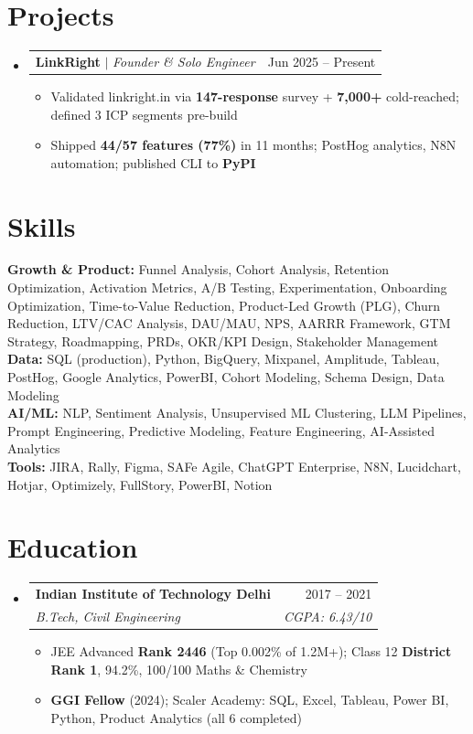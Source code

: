 \documentclass[a4paper,10pt]{article}
\makeatletter
\newcommand{\resumeItem}[1]{
  \item\small{#1\vspace{-2pt}}
}
\newcommand{\resumeSubheading}[4]{
  \vspace{-2pt}\item
  \begin{tabular*}{0.97\textwidth}[t]{l@{\extracolsep{\fill}}r}
    \textbf{#1} & #2 \\
    \textit{\small#3} & \textit{\small #4} \\
  \end{tabular*}\vspace{-7pt}
}
\newcommand{\resumeProjectHeading}[2]{
  \item
  \begin{tabular*}{0.97\textwidth}{l@{\extracolsep{\fill}}r}
    \small#1 & #2 \\
  \end{tabular*}\vspace{-7pt}
}
\newcommand{\resumeSubHeadingListStart}{\begin{itemize}[leftmargin=0.15in, label={}]}
\newcommand{\resumeSubHeadingListEnd}{\end{itemize}}
\newcommand{\resumeItemListStart}{\begin{itemize}\parfillskip=0pt}
\newcommand{\resumeItemListEnd}{\end{itemize}\vspace{-5pt}}
\makeatother
\begin{document}
\section{Projects}
\resumeSubHeadingListStart

  \resumeProjectHeading
    {\textbf{LinkRight} $|$ \emph{Founder \& Solo Engineer}}{Jun 2025 -- Present}
  \resumeItemListStart
    \resumeItem{Validated linkright.in via \textbf{147-response} survey + \textbf{7,000+} cold-reached; defined 3 ICP segments pre-build}
    \resumeItem{Shipped \textbf{44/57 features (77\%)} in 11 months; PostHog analytics, N8N automation; published CLI to \textbf{PyPI}}
  \resumeItemListEnd


\resumeSubHeadingListEnd

\section{Skills}
\begin{itemize}[leftmargin=0.15in, label={}]
  \small{\item{
    \textbf{Growth \& Product:}{ Funnel Analysis, Cohort Analysis, Retention Optimization, Activation Metrics, A/B Testing, Experimentation, Onboarding Optimization, Time-to-Value Reduction, Product-Led Growth (PLG), Churn Reduction, LTV/CAC Analysis, DAU/MAU, NPS, AARRR Framework, GTM Strategy, Roadmapping, PRDs, OKR/KPI Design, Stakeholder Management} \\
    \textbf{Data:}{ SQL (production), Python, BigQuery, Mixpanel, Amplitude, Tableau, PostHog, Google Analytics, PowerBI, Cohort Modeling, Schema Design, Data Modeling} \\
    \textbf{AI/ML:}{ NLP, Sentiment Analysis, Unsupervised ML Clustering, LLM Pipelines, Prompt Engineering, Predictive Modeling, Feature Engineering, AI-Assisted Analytics} \\
    \textbf{Tools:}{ JIRA, Rally, Figma, SAFe Agile, ChatGPT Enterprise, N8N, Lucidchart, Hotjar, Optimizely, FullStory, PowerBI, Notion}
  }}
\end{itemize}

\section{Education}
\resumeSubHeadingListStart
  \resumeSubheading
    {Indian Institute of Technology Delhi}{2017 -- 2021}
    {B.Tech, Civil Engineering}{CGPA: 6.43/10}
  \resumeItemListStart
    \resumeItem{JEE Advanced \textbf{Rank 2446} (Top 0.002\% of 1.2M+); Class 12 \textbf{District Rank 1}, 94.2\%, 100/100 Maths \& Chemistry}
    \resumeItem{\textbf{GGI Fellow} (2024); Scaler Academy: SQL, Excel, Tableau, Power BI, Python, Product Analytics (all 6 completed)}
  \resumeItemListEnd
\resumeSubHeadingListEnd
\end{document}
